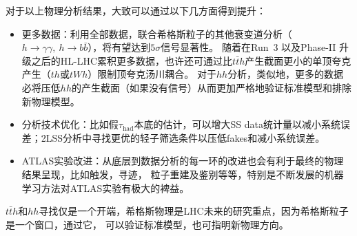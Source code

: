 对于以上物理分析结果，大致可以通过以下几方面得到提升：
\begin{itemize}
 \item 更多数据：利用全部\RunTwo 数据，联合希格斯粒子的其他衰变道分析（$h\rightarrow \gamma\gamma,~h\rightarrow b\bar{b}$），将有望达到$5\sigma$信号显著性。
随着在Run~3 以及Phase-II 升级之后的HL-LHC累积更多数据，也许还可通过比$t\bar{t}h$产生截面更小的单顶夸克产生（$th$或$tWh$）限制顶夸克汤川耦合。
对于$hh$分析，类似地，更多的数据必将压低$hh$的产生截面（如果没有信号）从而更加严格地验证标准模型和排除新物理模型。
 \item 分析技术优化：比如假$\tau_{\text{had}}$本底的估计，可以增大SS data统计量以减小系统误差；2LSS分析中寻找更优的轻子筛选条件以压低fakes和减小系统误差。
 \item ATLAS实验改进：从底层到数据分析的每一环的改进也会有利于最终的物理结果呈现，比如触发，寻迹，
粒子重建及鉴别等等，特别是不断发展的机器学习方法对ATLAS实验有极大的裨益。
\end{itemize}

$t\bar{t}h$和$hh$寻找仅是一个开端，希格斯物理是LHC未来的研究重点，因为希格斯粒子是一个窗口，通过它，
可以验证标准模型，也可指明新物理方向。
